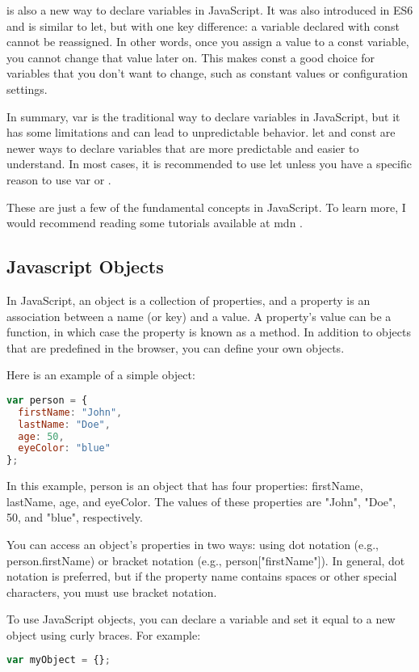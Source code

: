 { is also a new way to declare variables in JavaScript. It was also introduced in ES6 and is similar to let, but with one key difference: a variable declared with const cannot be reassigned. In other words, once you assign a value to a const variable, you cannot change that value later on. This makes const a good choice for variables that you don't want to change, such as constant values or configuration settings.

In summary, var is the traditional way to declare variables in JavaScript, but it has some limitations and can lead to unpredictable behavior. let and const are newer ways to declare variables that are more predictable and easier to understand. In most cases, it is recommended to use let unless you have a specific reason to use var or .


These are just a few of the fundamental concepts in JavaScript. To learn more, I would recommend reading some tutorials available at mdn \cite{mdnJs}.


\subsection{Javascript Objects}

In JavaScript, an object is a collection of properties, and a property is an association between a name (or key) and a value. A property's value can be a function, in which case the property is known as a method. In addition to objects that are predefined in the browser, you can define your own objects.

Here is an example of a simple object:

\begin{lstlisting}[language=Javascript, nolol, numbers=none]
var person = {
  firstName: "John",
  lastName: "Doe",
  age: 50,
  eyeColor: "blue"
};
\end{lstlisting}

In this example, person is an object that has four properties: firstName, lastName, age, and eyeColor. The values of these properties are "John", "Doe", 50, and "blue", respectively.

You can access an object's properties in two ways: using dot notation (e.g., person.firstName) or bracket notation (e.g., person["firstName"]). In general, dot notation is preferred, but if the property name contains spaces or other special characters, you must use bracket notation.


To use JavaScript objects, you can declare a variable and set it equal to a new object using curly braces. For example:
\begin{lstlisting}[language=Javascript, nolol]
var myObject = {};
\end{lstlisting}

}

